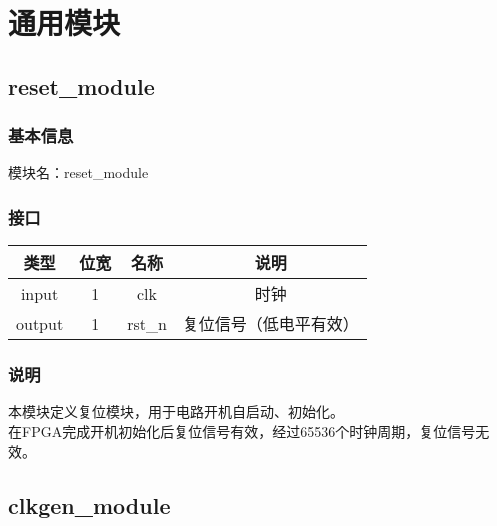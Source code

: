 %
% 
% 
% 
% 
% 
% 
%

\chapter{通用模块}

\section{reset\_module}
\subsection{基本信息}
模块名：reset\_module
\subsection{接口}
\begin{tabular}{|c|c|c|c|}
    \hline
    类型    &   位宽    &   名称    &   说明\\\hline
    input   &   1   &   clk &   时钟\\\hline
    output   &   1   &   rst\_n  &   复位信号（低电平有效）\\\hline
\end{tabular}
\subsection{说明}
本模块定义复位模块，用于电路开机自启动、初始化。\\
在FPGA完成开机初始化后复位信号有效，经过65536个时钟周期，复位信号无效。

\section{clkgen\_module}
